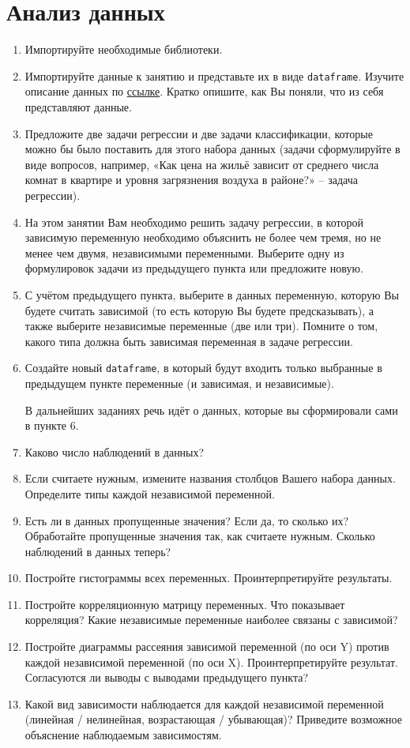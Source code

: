 \documentclass[11pt, a4paper]{extarticle}
\begin{document}
\section{Анализ данных}
\begin{enumerate}
	\item Импортируйте необходимые библиотеки.
	\item Импортируйте данные к занятию и представьте их в виде {\tt dataframe}. Изучите описание данных по \href{https://www.kaggle.com/budincsevity/szeged-weather}{ссылке}. Кратко опишите, как Вы поняли, что из себя представляют данные. 
	\item Предложите две задачи регрессии и две задачи классификации, которые можно бы было поставить для этого набора данных (задачи сформулируйте в виде вопросов, например, «Как цена на жильё зависит от среднего числа комнат в квартире и уровня загрязнения воздуха в районе?» – задача регрессии). 
	\item На этом занятии Вам необходимо решить задачу регрессии, в которой зависимую переменную необходимо объяснить не более чем тремя, но не менее чем двумя, независимыми переменными. Выберите одну из формулировок задачи из предыдущего пункта или предложите новую. 
	\item С учётом предыдущего пункта, выберите в данных переменную, которую Вы будете считать зависимой (то есть которую Вы будете предсказывать), а также выберите независимые переменные (две или три). Помните о том, какого типа должна быть зависимая переменная в задаче регрессии. 
	\item Создайте новый {\tt dataframe}, в который будут входить только выбранные в предыдущем пункте переменные (и зависимая, и независимые). 
	
	\vspace{1.5em}
	В дальнейших заданиях речь идёт о данных, которые вы сформировали сами в пункте 6.
	
	\item Каково число наблюдений в данных? 
	\item Если считаете нужным, измените названия столбцов Вашего набора данных. Определите типы каждой независимой переменной.  
	\item Есть ли в данных пропущенные значения? Если да, то сколько их? Обработайте пропущенные значения так, как считаете нужным. Сколько наблюдений в данных теперь?
	\item Постройте гистограммы всех переменных. Проинтерпретируйте результаты.
	\item Постройте корреляционную матрицу переменных. Что показывает корреляция? Какие независимые переменные наиболее связаны с зависимой? 
	\item Постройте диаграммы рассеяния зависимой переменной (по оси Y) против каждой независимой переменной (по оси X). Проинтерпретируйте результат. Согласуются ли выводы с выводами предыдущего пункта? 
	\item Какой вид зависимости наблюдается для каждой независимой переменной (линейная / нелинейная, возрастающая / убывающая)? Приведите возможное объяснение наблюдаемым зависимостям.
\end{enumerate}
\end{document}
